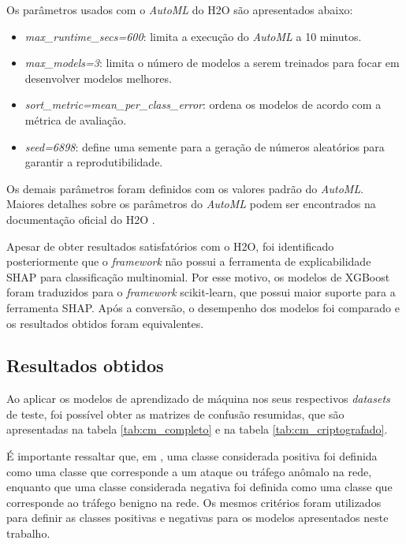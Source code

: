 \documentclass[12pt]{article}
\begin{document}
Os parâmetros usados com o \emph{AutoML} do H2O são apresentados abaixo:

\begin{itemize}
    \item \emph{max\_runtime\_secs=600}: limita a execução do \emph{AutoML} a 10 minutos.
    \item \emph{max\_models=3}: limita o número de modelos a serem treinados para focar em desenvolver modelos melhores.
    \item \emph{sort\_metric=mean\_per\_class\_error}: ordena os modelos de acordo com a métrica de avaliação.
    \item \emph{seed=6898}: define uma semente para a geração de números aleatórios para garantir a reprodutibilidade.
\end{itemize}

Os demais parâmetros foram definidos com os valores padrão do \emph{AutoML}. Maiores detalhes sobre os parâmetros do \emph{AutoML} podem ser encontrados na documentação oficial do H2O \cite{h2oai}.

Apesar de obter resultados satisfatórios com o H2O, foi identificado posteriormente que o \emph{framework} não possui a ferramenta de explicabilidade SHAP para classificação multinomial. Por esse motivo, os modelos de XGBoost foram traduzidos para o \emph{framework} scikit-learn, que possui maior suporte para a ferramenta SHAP. Após a conversão, o desempenho dos modelos foi comparado e os resultados obtidos foram equivalentes.

\subsection{Resultados obtidos}
\label{sec:resultados}

Ao aplicar os modelos de aprendizado de máquina nos seus respectivos \emph{datasets} de teste, foi possível obter as matrizes de confusão resumidas, que são apresentadas na tabela \ref{tab:cm_completo} e na tabela \ref{tab:cm_criptografado}.

É importante ressaltar que, em \cite{rosay2021cic}, uma classe considerada positiva foi definida como uma classe que corresponde a um ataque ou tráfego anômalo na rede, enquanto que uma classe considerada negativa foi definida como uma classe que corresponde ao tráfego benigno na rede. Os mesmos critérios foram utilizados para definir as classes positivas e negativas para os modelos apresentados neste trabalho.
\end{document}
